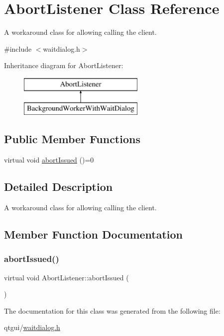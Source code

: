 \hypertarget{class_abort_listener}{}\section{Abort\+Listener Class Reference}
\label{class_abort_listener}


A workaround class for allowing calling the client.  




{\ttfamily \#include $<$waitdialog.\+h$>$}

Inheritance diagram for Abort\+Listener\+:\begin{figure}[H]
\begin{center}
\leavevmode
\includegraphics[height=2.000000cm]{d6/dfc/class_abort_listener}
\end{center}
\end{figure}
\subsection*{Public Member Functions}
\begin{DoxyCompactItemize}
\item 
virtual void \mbox{\hyperlink{class_abort_listener_a8b6d30bebb5b491579ad497f29ccc2e0}{abort\+Issued}} ()=0
\end{DoxyCompactItemize}


\subsection{Detailed Description}
A workaround class for allowing calling the client. 

\subsection{Member Function Documentation}
\mbox{\label{class_abort_listener_a8b6d30bebb5b491579ad497f29ccc2e0}} 
\subsubsection{\texorpdfstring{abortIssued()}{abortIssued()}}
{\footnotesize\ttfamily virtual void Abort\+Listener\+::abort\+Issued (\begin{DoxyParamCaption}{ }\end{DoxyParamCaption})\hspace{0.3cm}{\ttfamily [pure virtual]}}



The documentation for this class was generated from the following file\+:\begin{DoxyCompactItemize}
\item 
qtgui/\mbox{\hyperlink{waitdialog_8h}{waitdialog.\+h}}\end{DoxyCompactItemize}

